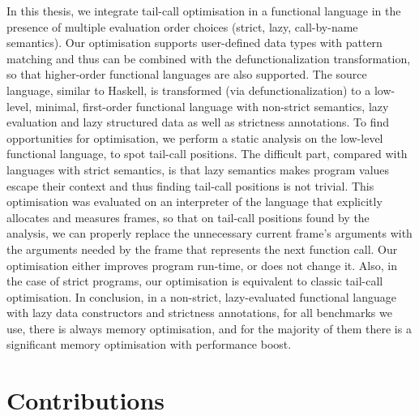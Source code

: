\documentclass[diploma]{softlab-thesis}
\begin{document}
In this thesis, we integrate tail-call optimisation in a functional 
language in the presence of multiple evaluation order choices (strict, lazy, call-by-name semantics). 
Our optimisation supports user-defined data types with pattern matching and thus can be combined with the
defunctionalization transformation, so that higher-order functional languages are also supported. The source language, similar to Haskell, 
is transformed (via defunctionalization) to a low-level, minimal, first-order functional language 
with non-strict semantics, lazy evaluation and lazy structured data as well as strictness 
annotations. To find opportunities for optimisation, we perform a static analysis on the 
low-level functional language, to spot tail-call positions. The difficult part, 
compared with languages with strict semantics, is that lazy semantics makes program values escape 
their context and thus finding tail-call positions is not trivial. This optimisation was evaluated
on an interpreter of the language that explicitly allocates and measures frames, so that on 
tail-call positions found by the analysis, we can properly replace the unnecessary current 
frame's arguments with the arguments needed by the frame that represents the next function call. 
Our optimisation either improves program run-time, or does not change it. Also, in the case of 
strict programs, our optimisation is equivalent to classic tail-call optimisation. In conclusion,
in a non-strict, lazy-evaluated functional language with lazy data constructors and strictness 
annotations, for all benchmarks we use, there is always memory optimisation, and for the majority 
of them there is a significant memory optimisation with performance boost.

\section{Contributions}
\end{document}
